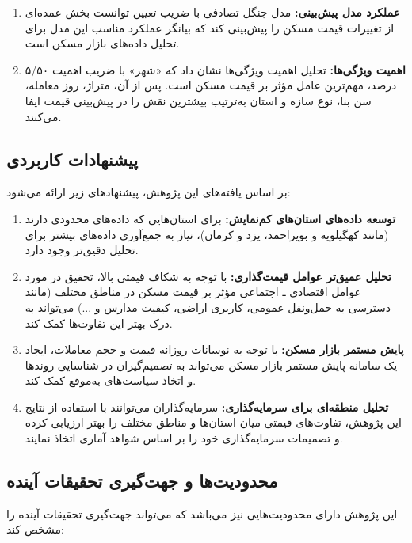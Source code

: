 \documentclass[twoside,reqno]{amsart}
\begin{document}
\begin{enumerate}
\item \textbf{عملکرد مدل پیش‌بینی:} مدل جنگل تصادفی با ضریب تعیین  توانست بخش عمده‌ای از تغییرات قیمت مسکن را پیش‌بینی کند که بیانگر عملکرد مناسب این مدل برای تحلیل داده‌های بازار مسکن است.
                
\item \textbf{اهمیت ویژگی‌ها:} تحلیل اهمیت ویژگی‌ها نشان داد که «شهر» با ضریب اهمیت ۵/۵۰ درصد، مهم‌ترین عامل مؤثر بر قیمت مسکن است. پس از آن، متراژ، روز معامله، سن بنا، نوع سازه و استان به‌ترتیب بیشترین نقش را در پیش‌بینی قیمت ایفا می‌کنند.
\end{enumerate}

\subsection{پیشنهادات کاربردی}

بر اساس یافته‌های این پژوهش، پیشنهادهای زیر ارائه می‌شود:

\begin{enumerate}
    \item \textbf{توسعه داده‌های استان‌های کم‌نمایش:} برای استان‌هایی که داده‌های محدودی دارند (مانند کهگیلویه و بویراحمد، یزد و کرمان)، نیاز به جمع‌آوری داده‌های بیشتر برای تحلیل دقیق‌تر وجود دارد.

    \item \textbf{تحلیل عمیق‌تر عوامل قیمت‌گذاری:} با توجه به شکاف قیمتی بالا، تحقیق در مورد عوامل اقتصادی ـ اجتماعی مؤثر بر قیمت مسکن در مناطق مختلف (مانند دسترسی به حمل‌ونقل عمومی، کاربری اراضی، کیفیت مدارس و ...) می‌تواند به درک بهتر این تفاوت‌ها کمک کند.

    \item \textbf{پایش مستمر بازار مسکن:} با توجه به نوسانات روزانه قیمت و حجم معاملات، ایجاد یک سامانه پایش مستمر بازار مسکن می‌تواند به تصمیم‌گیران در شناسایی روندها و اتخاذ سیاست‌های به‌موقع کمک کند.

    \item \textbf{تحلیل منطقه‌ای برای سرمایه‌گذاری:} سرمایه‌گذاران می‌توانند با استفاده از نتایج این پژوهش، تفاوت‌های قیمتی میان استان‌ها و مناطق مختلف را بهتر ارزیابی کرده و تصمیمات سرمایه‌گذاری خود را بر اساس شواهد آماری اتخاذ نمایند.
\end{enumerate}

\subsection{محدودیت‌ها و جهت‌گیری تحقیقات آینده}

این پژوهش دارای محدودیت‌هایی نیز می‌باشد که می‌تواند جهت‌گیری تحقیقات آینده را مشخص کند:
\end{document}
